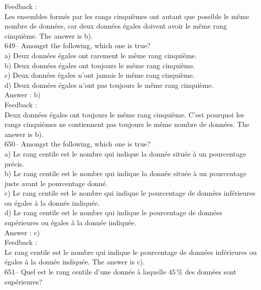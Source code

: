﻿\documentclass[letterpaper, 12pt]{article}
\begin{document}
Feedback : \\
Les ensembles form\'es par les rangs cinqui\`emes ont autant que possible le
m\^eme nombre de donn\'ees, car deux donn\'ees \'egales doivent avoir le
m\^eme rang cinqui\`eme.  The answer is b).\\

649-- Amongst the following, which one is true?\\
a) Deux donn\'ees \'egales ont rarement le m\^eme rang cinqui\`eme.\\
b) Deux donn\'ees \'egales ont toujours le m\^eme rang cinqui\`eme.\\
c) Deux donn\'ees \'egales n'ont jamais le m\^eme rang cinqui\`eme.\\
d) Deux donn\'ees \'egales n'ont pas toujours le m\^eme rang cinqui\`eme.\\

Answer : b)\\

Feedback : \\
Deux donn\'ees \'egales ont toujours le m\^eme rang cinqui\`eme.  C'est
pourquoi les rangs cinqui\`emes ne contiennent pas toujours le m\^eme nombre
de donn\'ees.  The answer is b).\\

650-- Amongst the following, which one is true?\\
a) Le rang centile est le nombre qui indique la donn\'ee situ\'ee \`a un
pourcentage pr\'ecis.  \\
b) Le rang centile est le nombre qui indique la donn\'ee situ\'ee \`a un
pourcentage juste avant le pourcentage donn\'e.\\
c) Le rang centile est le nombre qui indique le pourcentage de donn\'ees
inf\'erieures ou \'egales \`a la donn\'ee indiqu\'ee. \\
d) Le rang centile est le nombre qui indique le pourcentage de donn\'ees
sup\'erieures ou \'egales \`a la donn\'ee indiqu\'ee.\\

Answer : c)\\

Feedback : \\
Le rang centile est le nombre qui indique le pourcentage de donn\'ees
inf\'erieures ou \'egales \`a la donn\'ee indiqu\'ee. The answer is c).\\

651-- Quel est le rang centile d'une donn\'ee \`a laquelle $45\,\%$ des
donn\'ees sont sup\'erieures?\\
\end{document}
